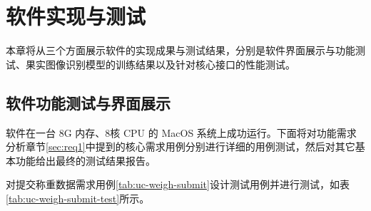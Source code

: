 \chapter{软件实现与测试}

本章将从三个方面展示软件的实现成果与测试结果，分别是软件界面展示与功能测试、果实图像识别模型的训练结果以及针对核心接口的性能测试。

\section{软件功能测试与界面展示}\label{sec:test-func}

软件在一台 8G 内存、8核 CPU 的 MacOS 系统上成功运行。下面将对功能需求分析章节\ref{sec:req1}中提到的核心需求用例分别进行详细的用例测试，然后对其它基本功能给出最终的测试结果报告。

对提交称重数据需求用例\ref{tab:uc-weigh-submit}设计测试用例并进行测试，如表\ref{tab:uc-weigh-submit-test}所示。

